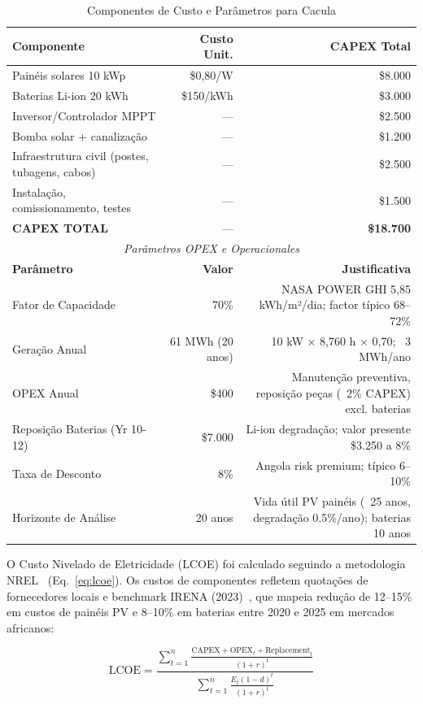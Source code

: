 \documentclass[12pt, a4paper]{article}
\begin{document}
\begin{table}[H]
\centering
\caption{Componentes de Custo e Parâmetros para Cacula}
\label{Tab:3}
\small
\begin{tabular}{|l|r|r|}
\hline
\textbf{Componente} & \textbf{Custo Unit.} & \textbf{CAPEX Total} \\
\hline
Painéis solares 10 kWp & \$0,80/W & \$8.000 \\
Baterias Li-ion 20 kWh & \$150/kWh & \$3.000 \\
Inversor/Controlador MPPT & --- & \$2.500 \\
Bomba solar + canalização & --- & \$1.200 \\
Infraestrutura civil (postes, tubagens, cabos) & --- & \$2.500 \\
Instalação, comissionamento, testes & --- & \$1.500 \\
\hline
\textbf{CAPEX TOTAL} & --- & \textbf{\$18.700} \\
\hline
\multicolumn{3}{c}{\textit{Parâmetros OPEX e Operacionales}} \\
\hline
\textbf{Parâmetro} & \textbf{Valor} & \textbf{Justificativa} \\
\hline
Fator de Capacidade & 70\% & NASA POWER GHI 5,85 kWh/m²/dia; factor típico 68–72\% \\
Geração Anual & 61 MWh (20 anos) & 10 kW × 8,760 h × 0,70; ~3 MWh/ano \\
OPEX Anual & \$400 & Manutenção preventiva, reposição peças (~2\% CAPEX) excl. baterias \\
Reposição Baterias (Yr 10-12) & \$7.000 & Li-ion degradação; valor presente ~\$3.250 a 8\% \\
Taxa de Desconto & 8\% & Angola risk premium; típico 6–10\% \\
Horizonte de Análise & 20 anos & Vida útil PV painéis (~25 anos, degradação 0.5\%/ano); baterias ~10 anos \\
\hline
\end{tabular}
\end{table}

O Custo Nivelado de Eletricidade (LCOE) foi calculado seguindo a metodologia NREL~\citep{NREL2020} (Eq.~\ref{eq:lcoe}). Os custos de componentes refletem quotações de fornecedores locais e benchmark IRENA (2023)~\citep{IRENA2023}, que mapeia redução de 12--15\% em custos de painéis PV e 8--10\% em baterias entre 2020 e 2025 em mercados africanos:

\begin{equation}
\label{eq:lcoe}
\text{LCOE} = \frac{\sum_{t=1}^{n} \frac{\text{CAPEX} + \text{OPEX}_t + \text{Replacement}_t}{(1+r)^t}}{\sum_{t=1}^{n} \frac{E_t(1-d)^t}{(1+r)^t}}
\end{equation}
\end{document}
